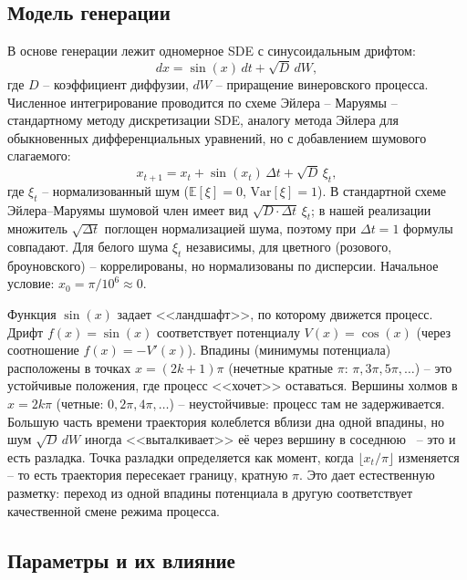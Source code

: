 \documentclass[12pt,a4paper]{article}
\begin{document}
\subsection{Модель генерации}

В основе генерации лежит одномерное SDE с синусоидальным дрифтом:
\begin{equation}
dx = \sin(x)\,dt + \sqrt{D}\,dW,
\label{eq:sde}
\end{equation}
где $D$  -- коэффициент диффузии, $dW$  -- приращение винеровского процесса. Численное интегрирование проводится по схеме Эйлера -- Маруямы -- стандартному методу дискретизации SDE, аналогу метода Эйлера для обыкновенных дифференциальных уравнений, но с добавлением шумового слагаемого:
\begin{equation}
x_{t+1} = x_t + \sin(x_t)\,\Delta t + \sqrt{D}\,\xi_t,
\end{equation}
где $\xi_t$ -- нормализованный шум ($\mathbb{E}[\xi] = 0$, $\text{Var}[\xi] = 1$). В стандартной схеме Эйлера--Маруямы шумовой член имеет вид $\sqrt{D \cdot \Delta t}\,\xi_t$; в нашей реализации множитель $\sqrt{\Delta t}$ поглощен нормализацией шума, поэтому при $\Delta t = 1$ формулы совпадают. Для белого шума $\xi_t$ независимы, для цветного (розового, броуновского) -- коррелированы, но нормализованы по дисперсии. Начальное условие: $x_0 = \pi / 10^6 \approx 0$.

Функция $\sin(x)$ задает <<ландшафт>>, по которому движется процесс. Дрифт $f(x) = \sin(x)$ соответствует потенциалу $V(x) = \cos(x)$ (через соотношение $f(x) = -V'(x)$). Впадины (минимумы потенциала) расположены в точках $x = (2k+1)\pi$ (нечетные кратные $\pi$: $\pi, 3\pi, 5\pi, \ldots$) -- это устойчивые положения, где процесс <<хочет>> оставаться. Вершины холмов в $x = 2k\pi$ (четные: $0, 2\pi, 4\pi, \ldots$) -- неустойчивые: процесс там не задерживается. Большую часть времени траектория колеблется вблизи дна одной впадины, но шум $\sqrt{D}\,dW$ иногда <<выталкивает>> её через вершину в соседнюю~ -- это и есть разладка.
Точка разладки определяется как момент, когда $\lfloor x_t / \pi \rfloor$ изменяется  -- то есть траектория пересекает границу, кратную $\pi$. Это дает естественную разметку: переход из одной впадины потенциала в другую соответствует качественной смене режима процесса.

\subsection{Параметры и их влияние}
\end{document}

